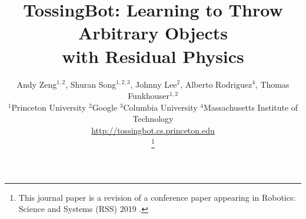\documentclass[journal]{IEEEtran}
\newcommand{\ie}{\textit{i}.\textit{e}., }
\begin{document}
%
\title{TossingBot: Learning to Throw Arbitrary Objects\\with Residual Physics}
%
%
%

\author{
Andy Zeng$^{1,2}$, %
Shuran Song$^{1,2,3}$, %
Johnny Lee$^{2}$, %
Alberto Rodriguez$^{4}$, %
Thomas Funkhouser$^{1,2}$ %
\vspace{1mm} \\ 
$^{1}$Princeton University\quad
$^{2}$Google\quad
$^{3}$Columbia University\quad
$^{4}$Massachusetts Institute of Technology
\vspace{1mm} \\
\href{http://tossingbot.cs.princeton.edu/}{http://tossingbot.cs.princeton.edu}
\vspace{-2em}

\thanks{
This journal paper is a revision of a conference paper appearing in Robotics: Science and Systems (RSS) 2019 \cite{zeng2019tossingbot}.
}
}
\end{document}
